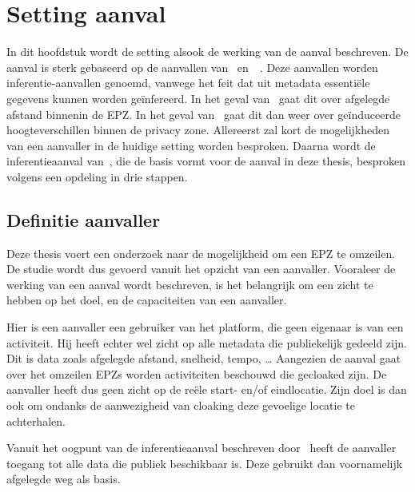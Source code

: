 
\chapter{Setting aanval}\label{chap:inferentieaanval}
In dit hoofdstuk wordt de setting alsook de werking van de aanval beschreven.
De aanval is sterk gebaseerd op de aanvallen
van~\citeauthor{Dhondt}
en~\citeauthor{Verdonck_2022}~\cite{Verdonck_2022,
    Dhondt}. Deze aanvallen worden
inferentie-aanvallen genoemd, vanwege het feit dat uit metadata essentiële
gegevens kunnen worden geïnfereerd. In het geval
van~\citeauthor{Dhondt} gaat dit over
afgelegde afstand binnenin de \ac{EPZ}. In het geval
van~\citeauthor{Verdonck_2022} gaat dit dan weer over geïnduceerde
hoogteverschillen binnen de privacy zone. Allereerst zal kort de mogelijkheden
van een aanvaller in de huidige setting worden besproken. Daarna wordt de
inferentieaanval
van~\citeauthor{Dhondt}, die de basis
vormt voor de aanval in deze thesis, besproken volgens een opdeling in drie
stappen.

\section{Definitie aanvaller}\label{sec:definitie-aanvaller}
Deze thesis voert een onderzoek naar de mogelijkheid om een \ac{EPZ} te
omzeilen. De studie wordt dus gevoerd vanuit het opzicht van een aanvaller.
Vooraleer de werking van een aanval wordt beschreven, is het belangrijk om een
zicht te hebben op het doel, en de capaciteiten van een aanvaller.

Hier is een aanvaller een gebruiker van het platform, die geen eigenaar is van
een activiteit. Hij heeft echter wel zicht op alle metadata die publiekelijk
gedeeld zijn. Dit is data zoals afgelegde afstand, snelheid, tempo, \ldots
Aangezien de aanval gaat over het omzeilen \acp{EPZ} worden activiteiten
beschouwd die gecloaked zijn. De aanvaller heeft dus geen zicht op de reële
start- en/of eindlocatie. Zijn doel is dan ook om ondanks de aanwezigheid van
cloaking deze gevoelige locatie te achterhalen.

Vanuit het oogpunt van de inferentieaanval beschreven
door~\citeauthor{Dhondt} heeft de
aanvaller toegang tot alle data die publiek beschikbaar is. Deze gebruikt dan
voornamelijk afgelegde weg als basis.

